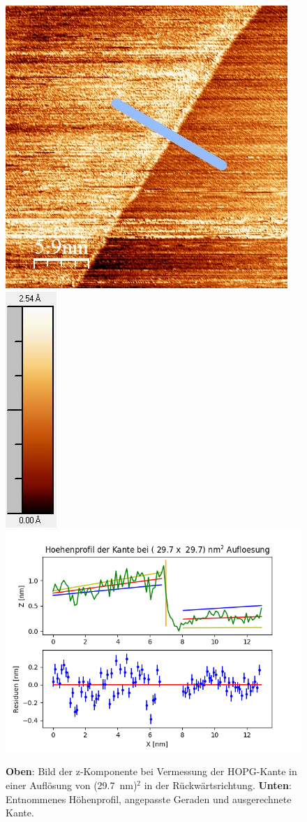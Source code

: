 \documentclass[12pt,a4paper]{article}
\begin{document}
\begin{figure}[H]
\centering
\includegraphics[scale=0.6]{Bilder/Anhang/Kante/0297_Kante_nach.jpg}
\includegraphics[scale=0.7]{Bilder/Anhang/Kante/0297_Kante_nach_Skala.jpg}
\includegraphics[scale=0.55]{Bilder/Anhang/Kante/Profil_Kante_0297_rueck.png}
\caption{\textbf{Oben}: Bild der z-Komponente bei Vermessung der HOPG-Kante in einer Auflösung von (\SI{29,7}{nm})$^2$ in der Rückwärtsrichtung. \textbf{Unten}: Entnommenes Höhenprofil, angepasste Geraden und ausgerechnete Kante.}
\end{figure}
\end{document}
